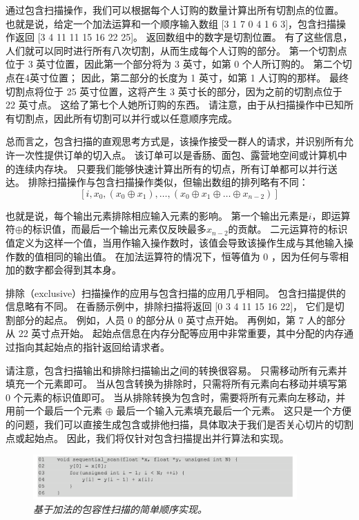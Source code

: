 通过包含扫描操作，我们可以根据每个人订购的数量计算出所有切割点的位置。 
也就是说，给定一个加法运算和一个顺序输入数组 [3 1 7 0 4 1 6 3]，包含扫描操作返回 
[3 4 11 11 15 16 22 25]。 返回数组中的数字是切割位置。 
有了这些信息，人们就可以同时进行所有八次切割，从而生成每个人订购的部分。 
第一个切割点位于 3 英寸位置，因此第一个部分将为 3 英寸，如第 0 个人所订购的。 
第二个切点在4英寸位置； 因此，第二部分的长度为 1 英寸，如第 1 人订购的那样。 
最终切割点将位于 25 英寸位置，这将产生 3 英寸长的部分，因为之前的切割点位于 22 英寸点。 
这给了第七个人她所订购的东西。 请注意，由于从扫描操作中已知所有切割点，因此所有切割可以并行或以任意顺序完成。

总而言之，包含扫描的直观思考方式是，该操作接受一群人的请求，并识别所有允许一次性提供订单的切入点。 
该订单可以是香肠、面包、露营地空间或计算机中的连续内存块。 
只要我们能够快速计算出所有的切点，所有订单都可以并行送达。 排除扫描操作与包含扫描操作类似，但输出数组的排列略有不同：
$$
\left[i, x_{0},\left(x_{0} \oplus x_{1}\right), \ldots,\left(x_{0} \oplus x_{1} \oplus \ldots \oplus x_ {n-2}\right)\right]
$$

也就是说，每个输出元素排除相应输入元素的影响。 
第一个输出元素是$i$，即运算符$\oplus$的标识值，而最后一个输出元素仅反映最多$x_{n-2}$的贡献。 
二元运算符的标识值定义为这样一个值，当用作输入操作数时，该值会导致该操作生成与其他输入操作数的值相同的输出值。 
在加法运算符的情况下，恒等值为 0 ，因为任何与零相加的数字都会得到其本身。

排除（exclusive）扫描操作的应用与包含扫描的应用几乎相同。 包含扫描提供的信息略有不同。 
在香肠示例中，排除扫描将返回 [0 3 4 11 15 16 22]，
它们是切割部分的起点。 例如，人员 0 的部分从 0 英寸点开始。 再例如，第 7 人的部分从 22 英寸点开始。 
起始点信息在内存分配等应用中非常重要，其中分配的内存通过指向其起始点的指针返回给请求者。

请注意，包含扫描输出和排除扫描输出之间的转换很容易。 只需移动所有元素并填充一个元素即可。 
当从包含转换为排除时，只需将所有元素向右移动并填写第 0 个元素的标识值即可。 
当从排除转换为包含时，需要将所有元素向左移动，并用前一个最后一个元素 $\oplus$ 最后一个输入元素填充最后一个元素。 
这只是一个方便的问题，我们可以直接生成包含或排他扫描，具体取决于我们是否关心切片的切割点或起始点。 
因此，我们将仅针对包含扫描提出并行算法和实现。

\begin{figure}[H]
	\centering
	\includegraphics[width=0.9\textwidth]{figs/F11.1.png}
	\caption{\textit{基于加法的包容性扫描的简单顺序实现。}}
\end{figure}

